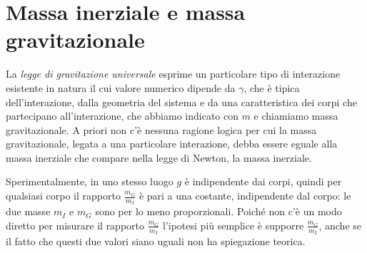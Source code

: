 \documentclass[class=book, crop=false, oneside, 12pt]{standalone}
\begin{document}
\section{Massa inerziale e massa gravitazionale}

La \emph{legge di gravitazione universale} esprime un particolare tipo di interazione esistente in natura il cui valore numerico dipende da \(\gamma\), che è tipica dell'interazione, dalla geometria del sistema e da una caratteristica dei corpi che partecipano all'interazione, che abbiamo indicato con \(m\) e chiamiamo massa gravitazionale. 
A priori non c'è nessuna ragione logica per cui la massa gravitazionale, legata a una particolare interazione, debba essere eguale alla massa inerziale che compare nella legge di Newton, la massa inerziale.

Sperimentalmente, in uno stesso luogo \(g\) è indipendente dai corpi, quindi per qualsiasi corpo il rapporto $\frac{m_G}{m_I}$ è pari a una costante, indipendente dal corpo: 
le due masse \(m_I\) e \(m_G\) sono per lo meno proporzionali.
Poiché non c'è un modo diretto per misurare il rapporto $\frac{m_G}{m_I}$ l'ipotesi più semplice è supporre $\frac{m_G}{m_I}$, anche se il fatto che questi due valori siano uguali non ha spiegazione teorica.
\end{document}
